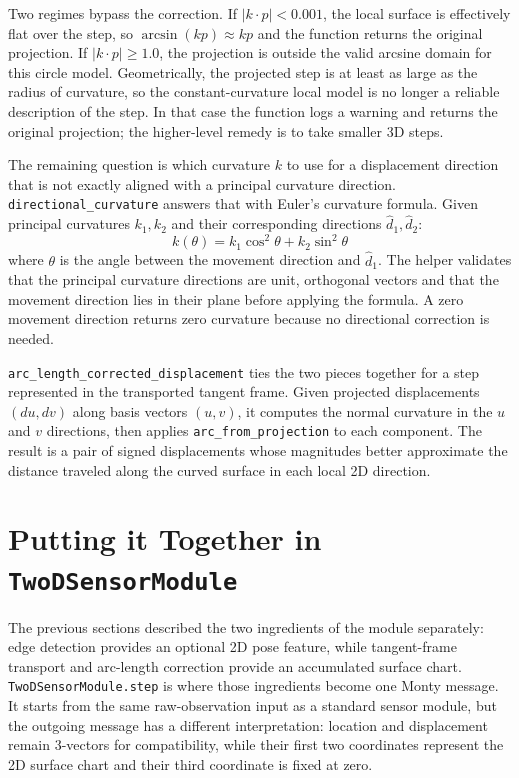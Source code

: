 \documentclass{article}
\begin{document}
Two regimes bypass the correction.
If $|k \cdot p| < 0.001$, the local surface is effectively flat over the step, so $\arcsin(kp) \approx kp$ and the function returns the original projection.
If $|k \cdot p| \geq 1.0$, the projection is outside the valid arcsine domain for this circle model.
Geometrically, the projected step is at least as large as the radius of curvature, so the constant-curvature local model is no longer a reliable description of the step.
In that case the function logs a warning and returns the original projection; the higher-level remedy is to take smaller 3D steps.

The remaining question is which curvature $k$ to use for a displacement direction that is not exactly aligned with a principal curvature direction.
\texttt{directional\_curvature} answers that with Euler's curvature formula.
Given principal curvatures $k_1, k_2$ and their corresponding directions $\hat{d}_1, \hat{d}_2$:
\[
  k(\theta) = k_1 \cos^2\theta + k_2 \sin^2\theta
\]
where $\theta$ is the angle between the movement direction and $\hat{d}_1$.
The helper validates that the principal curvature directions are unit, orthogonal vectors and that the movement direction lies in their plane before applying the formula.
A zero movement direction returns zero curvature because no directional correction is needed.

\texttt{arc\_length\_corrected\_displacement} ties the two pieces together for a step represented in the transported tangent frame.
Given projected displacements $(du, dv)$ along basis vectors $(u, v)$, it computes the normal curvature in the $u$ and $v$ directions, then applies \texttt{arc\_from\_projection} to each component.
The result is a pair of signed displacements whose magnitudes better approximate the distance traveled along the curved surface in each local 2D direction.

\section{Putting it Together in \texttt{TwoDSensorModule}}

The previous sections described the two ingredients of the module separately: edge detection provides an optional 2D pose feature, while tangent-frame transport and arc-length correction provide an accumulated surface chart.
\texttt{TwoDSensorModule.step} is where those ingredients become one Monty message.
It starts from the same raw-observation input as a standard sensor module, but the outgoing message has a different interpretation: location and displacement remain 3-vectors for compatibility, while their first two coordinates represent the 2D surface chart and their third coordinate is fixed at zero.
\end{document}
